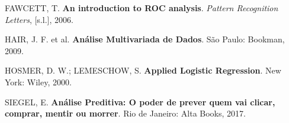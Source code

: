 \documentclass[12pt,brazil,oneside]{book}
\begin{document}
\hypertarget{refs}{}
\leavevmode\hypertarget{ref-Fawcett2006}{}%
FAWCETT, T. \textbf{An introduction to ROC analysis}. \emph{Pattern
Recognition Letters}, {[}s.l.{]}, 2006.

\leavevmode\hypertarget{ref-Hair2009}{}%
HAIR, J. F. et al. \textbf{Análise Multivariada de Dados}. São Paulo:
Bookman, 2009.

\leavevmode\hypertarget{ref-Hosmer2000}{}%
HOSMER, D. W.; LEMESCHOW, S. \textbf{Applied Logistic Regression}. New
York: Wiley, 2000.

\leavevmode\hypertarget{ref-Siegel2017}{}%
SIEGEL, E. \textbf{Análise Preditiva: O poder de prever quem vai clicar,
comprar, mentir ou morrer}. Rio de Janeiro: Alta Books, 2017.

\leavevmode\hypertarget{ref-Torres-Reyna2014}{}%
\end{document}
